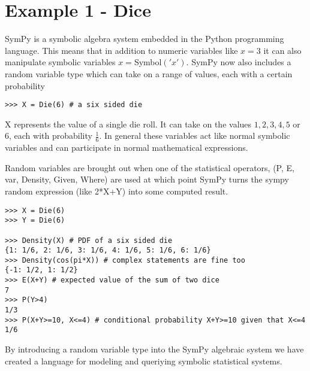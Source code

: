 \section{Example 1 - Dice}

SymPy is a symbolic algebra system embedded in the Python programming language. This means that in addition to numeric variables like $x = 3$ it can also manipulate symbolic variables $ x = $Symbol$('x')$.
SymPy now also includes a random variable type which can take on a range of values, each with a certain probability 

\begin{lstlisting}
>>> X = Die(6) # a six sided die
\end{lstlisting}

X represents the value of a single die roll. It can take on the values $1,2,3,4,5$ or $6$, each with probability $\frac{1}{6}$. In general these variables act like normal symbolic variables and can participate in normal mathematical expressions. 

Random variables are brought out when one of the statistical operators, (P, E, var, Density, Given, Where) are used at which point SymPy turns the sympy random expression (like 2*X+Y) into some computed result. 

\begin{lstlisting}
>>> X = Die(6)
>>> Y = Die(6)

>>> Density(X) # PDF of a six sided die
{1: 1/6, 2: 1/6, 3: 1/6, 4: 1/6, 5: 1/6, 6: 1/6}
>>> Density(cos(pi*X)) # complex statements are fine too
{-1: 1/2, 1: 1/2}
>>> E(X+Y) # expected value of the sum of two dice
7
>>> P(Y>4) 
1/3
>>> P(X+Y>=10, X<=4) # conditional probability X+Y>=10 given that X<=4
1/6
\end{lstlisting}

By introducing a random variable type into the SymPy algebraic system we have created a language for modeling and queriying symbolic statistical systems. 
